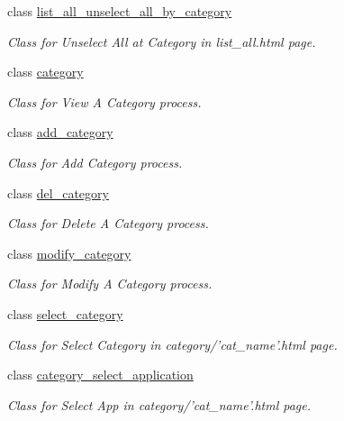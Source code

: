 \begin{CompactItemize}
class \hyperlink{classweb__winsol_1_1list__all__unselect__all__by__category}{list\_\-all\_\-unselect\_\-all\_\-by\_\-category}
\begin{CompactList}\small\item\em Class for {\em Unselect\/} {\em All\/} {\em at\/} {\em Category\/} in {\em list\_\-all.html\/} page. \item\end{CompactList}\item 
class \hyperlink{classweb__winsol_1_1category}{category}
\begin{CompactList}\small\item\em Class for {\em View\/} {\em A\/} {\em Category\/} process. \item\end{CompactList}\item 
class \hyperlink{classweb__winsol_1_1add__category}{add\_\-category}
\begin{CompactList}\small\item\em Class for {\em Add\/} {\em Category\/} process. \item\end{CompactList}\item 
class \hyperlink{classweb__winsol_1_1del__category}{del\_\-category}
\begin{CompactList}\small\item\em Class for {\em Delete\/} {\em A\/} {\em Category\/} process. \item\end{CompactList}\item 
class \hyperlink{classweb__winsol_1_1modify__category}{modify\_\-category}
\begin{CompactList}\small\item\em Class for {\em Modify\/} {\em A\/} {\em Category\/} process. \item\end{CompactList}\item 
class \hyperlink{classweb__winsol_1_1select__category}{select\_\-category}
\begin{CompactList}\small\item\em Class for {\em Select\/} {\em Category\/} in {\em category/'cat\_\-name'\/}.html page. \item\end{CompactList}\item 
class \hyperlink{classweb__winsol_1_1category__select__application}{category\_\-select\_\-application}
\begin{CompactList}\small\item\em Class for {\em Select\/} {\em App\/} in {\em category/'cat\_\-name'\/}.html page. \item\end{CompactList}\item 

\end{CompactItemize}
